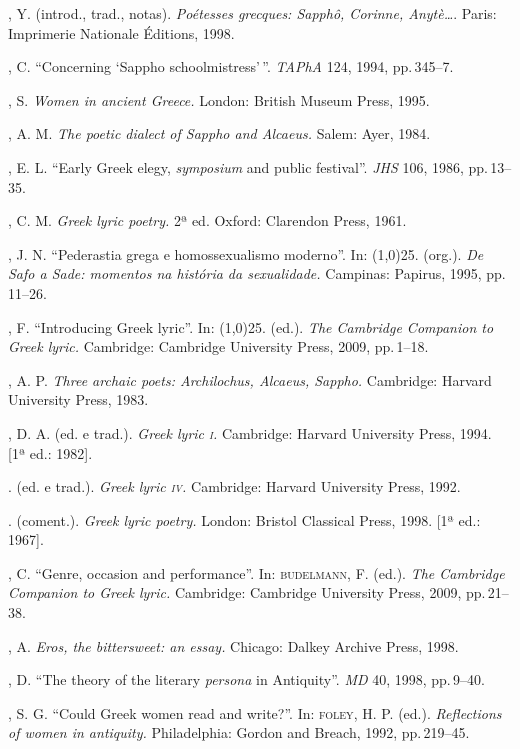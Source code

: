 \begin{bibliohedra}
, Y. (introd., trad., notas). \emph{Poétesses grecques:
Sapphô, Corinne, Anytè\ldots{}}. Paris: Imprimerie Nationale Éditions, 1998.

, C. “Concerning ‘Sappho schoolmistress’\,”. \emph{TAPhA} 124,
1994, pp.\,345--7.

, S. \emph{Women in ancient Greece.} London: British Museum
Press, 1995.

, A. M. \emph{The poetic dialect of Sappho and Alcaeus.} Salem:
Ayer, 1984. 

, E. L. “Early Greek elegy, \emph{symposium} and public festival”.
\emph{JHS} 106, 1986, pp.\,13--35.

, C. M. \emph{Greek lyric poetry.} 2ª
ed. Oxford: Clarendon Press, 1961.

, J. N. “Pederastia grega e homossexualismo moderno”. In:
\line(1,0){25}. (org.). \emph{De Safo a Sade: momentos na história da
sexualidade.} Campinas: Papirus, 1995, pp.\,11--26.

, F. “Introducing Greek lyric”. In:
\line(1,0){25}. (ed.). \emph{The Cambridge
Companion to Greek lyric.} Cambridge: Cambridge University Press, 2009, pp.\,1--18.

, A. P. \emph{Three archaic poets: Archilochus, Alcaeus,
Sappho.} Cambridge: Harvard University Press, 1983. 

, D. A. (ed. e trad.). \emph{Greek lyric \textsc{i}.} Cambridge:
Harvard University Press, 1994. {[}1ª ed.: 1982{]}.

\titidem. (ed. e trad.). \emph{Greek lyric \textsc{iv}.} Cambridge: Harvard
University Press, 1992.

\titidem. (coment.). \emph{Greek lyric poetry.} London: Bristol
Classical Press, 1998. {[}1ª ed.: 1967{]}. 

, C. “Genre, occasion and performance”. In:
\textsc{budelmann}, F. (ed.). \emph{The Cambridge Companion to Greek
lyric.} Cambridge: Cambridge University Press, 2009, pp.\,21--38.

, A. \emph{Eros, the bittersweet: an essay.} Chicago:
Dalkey Archive Press, 1998.

, D. “The theory of the literary \emph{persona} in Antiquity”.
\emph{MD} 40, 1998, pp.\,9--40.

, S. G. “Could Greek women read and write?”. In: \textsc{foley}, H.
P. (ed.). \emph{Reflections of women in antiquity.} Philadelphia: Gordon and
Breach, 1992, pp.\,219--45.


\end{bibliohedra}
